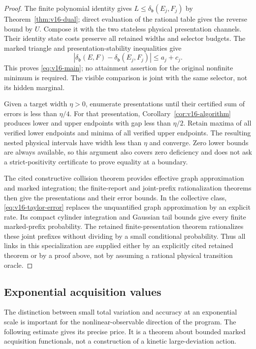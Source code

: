 \begin{proof}
The finite polynomial identity gives
$L\le\delta_{\mathfrak b}(E_j,F_j)$ by
Theorem~\ref{thm:v16-dual}; direct evaluation of the rational table
gives the reverse bound by $U$. Compose it with the two stateless
physical presentation channels. Their identity state costs preserve
all retained widths and selector budgets. The marked triangle and
presentation-stability inequalities give
\[
 |\delta_{\mathfrak b}(E,F)-\delta_{\mathfrak b}(E_j,F_j)|
                       \le a_j+c_j.
\]
This proves \eqref{eq:v16-main}; no attainment assertion for the original
nonfinite minimum is required. The visible comparison is joint with
the same selector, not its hidden marginal.

Given a target width $\eta>0$, enumerate presentations until their
certified sum of errors is less than $\eta/4$. For that presentation,
Corollary~\ref{cor:v16-algorithm} produces lower and upper endpoints
with gap less than $\eta/2$. Retain maxima of all verified lower
endpoints and minima of all verified upper endpoints. The resulting
nested physical intervals have width less than $\eta$ and converge.
Zero lower bounds are always available, so this argument also covers
zero deficiency and does not ask a strict-positivity certificate to
prove equality at a boundary.

The cited constructive collision theorem provides effective graph
approximation and marked integration; the finite-report and joint-prefix
rationalization theorems then give the presentations and their error
bounds. In the collective class, \eqref{eq:v16-taylor-error} replaces
the unquantified graph approximation by an explicit rate. Its compact
cylinder integration and Gaussian tail bounds give every finite
marked-prefix probability. The retained finite-presentation theorem
rationalizes these joint prefixes without dividing by a small
conditional probability. Thus all links in this specialization are
supplied either by an explicitly cited retained theorem or by a proof
above, not by assuming a rational physical transition oracle.
\end{proof}

\subsection{Exponential acquisition values}
The distinction between small total variation and accuracy at an
exponential scale is important for the nonlinear-observable direction
of the program. The following estimate gives its precise price. It
is a theorem about bounded marked acquisition functionals, not a
construction of a kinetic large-deviation action.

